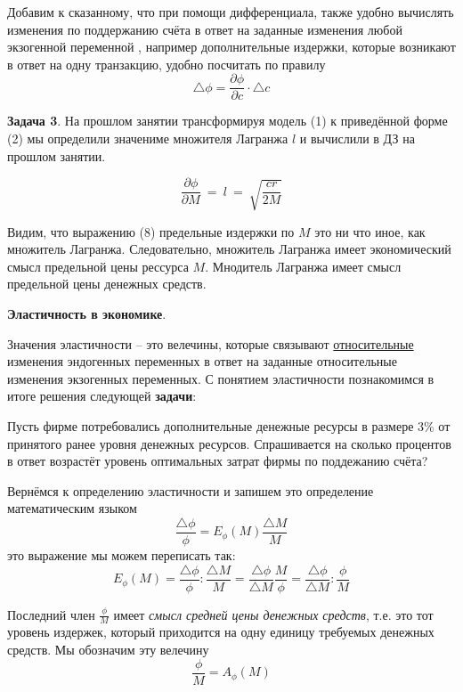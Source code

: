 \documentclass[12pt,a4paper]{article}
\begin{document}
Добавим к сказанному, что при помощи дифференциала, также удобно вычислять изменения по поддержанию счёта в ответ на заданные изменения любой экзогенной переменной , например дополнительные издержки, которые возникают в ответ на одну транзакцию, удобно посчитать по правилу 
\begin{equation}
\triangle \phi = \frac{\partial \phi}{\partial c} \cdot \triangle c
\end{equation}

\textbf{Задача 3}. На прошлом занятии трансформируя модель (1) к приведённой форме (2) мы определили значениме множителя Лагранжа $l$ и вычислили в ДЗ на прошлом занятии.

\begin{equation}
\frac{\partial \phi }{\partial M} \ =\ l\ =\ \sqrt{\frac{cr}{2M}}
\end{equation}

Видим, что выражению (8) предельные издержки по $M$ это ни что иное, как множитель Лагранжа. Следовательно, множитель Лагранжа имеет экономический смысл предельной цены рессурса $M$. Мнодитель Лагранжа имеет смысл предельной цены денежных средств.

\begin{center}
 \textbf{Эластичность в экономике}.
 \end{center} 

Значения эластичности -- это велечины, которые связывают \underline{относительные} изменения эндогенных переменных в ответ на заданные относительные изменения экзогенных переменных. С понятием эластичности познакомимся в итоге решения следующей \textbf{задачи}:

Пусть фирме потребовались дополнительные денежные ресурсы в размере 3\% от принятого ранее уровня денежных ресурсов. Спрашивается на сколько процентов в ответ возрастёт уровень оптимальных затрат фирмы по поддежанию счёта?

Вернёмся к определению эластичности и запишем это определение математическим языком 
\begin{equation}
\frac{\triangle \phi}{\phi} = E_\phi(M) \frac{\triangle M}{M}
\end{equation}
это выражение мы можем переписать так:
\begin{equation}
E_\phi(M) = \frac{\triangle \phi}{\phi} : \frac{\triangle M}{M} = \frac{\triangle \phi}{\triangle M} \frac{M}{\phi} = \frac{\triangle \phi}{\triangle M} : \frac{\phi}{M}
\end{equation}

Последний член $\displaystyle{\frac{\phi}{M}}$ имеет \textit{смысл средней цены денежных средств}, т.е. это тот уровень издержек, который приходится на одну единицу требуемых денежных средств. Мы обозначим эту велечину
\begin{equation}
\frac{\phi}{M} = A_{\phi} (M)
\end{equation}
\end{document}

